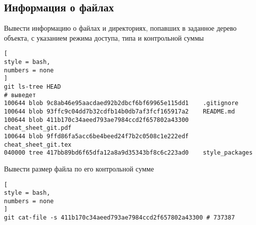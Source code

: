 \documentclass[%
	11pt,
	a4paper,
	utf8,
		]{article}
\begin{document}
\subsection{Информация о файлах}

Вывести информацию о файлах и директориях, попавших в заданное дерево объекта, с указанием режима доступа, типа и контрольной суммы
\begin{lstlisting}[
style = bash,
numbers = none
]
git ls-tree HEAD
# выведет
100644 blob 9c8ab46e95aacdaed92b2dbcf6bf69965e115dd1    .gitignore
100644 blob 93ffc9c04dd7b32cdfb14b0db7af3fcf165917a2    README.md
100644 blob 411b170c34aeed793ae7984ccd2f657802a43300    cheat_sheet_git.pdf
100644 blob 9ffd86fa5acc6be4beed24f7b2c0508c1e222edf    cheat_sheet_git.tex
040000 tree 417bb89bd6f65dfa12a8a9d35343bf8c6c223ad0    style_packages
\end{lstlisting}

Вывести размер файла по его контрольной сумме
\begin{lstlisting}[
style = bash,
numbers = none
]
git cat-file -s 411b170c34aeed793ae7984ccd2f657802a43300 # 737387
\end{lstlisting}



\begin{thebibliography}{99}
	
\end{thebibliography}

\end{document}
